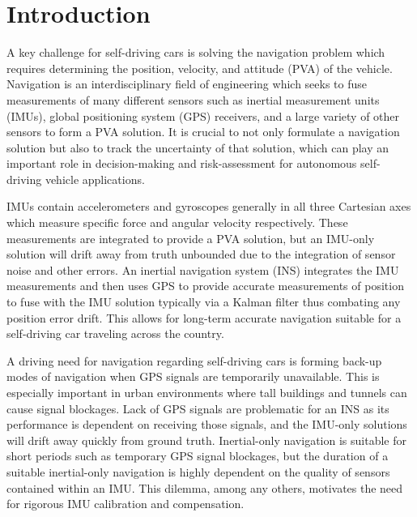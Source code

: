 
\begingroup
\allowdisplaybreaks

\section{Introduction}

A key challenge for self-driving cars is solving the navigation problem which requires determining the position, velocity, and attitude (PVA) of the vehicle. Navigation is an interdisciplinary field of engineering which seeks to fuse measurements of many different sensors such as inertial measurement units (IMUs), global positioning system (GPS) receivers, and a large variety of other sensors to form a PVA solution. It is crucial to not only formulate a navigation solution but also to track the uncertainty of that solution, which can play an important role in decision-making and risk-assessment for autonomous self-driving vehicle applications.

IMUs contain accelerometers and gyroscopes generally in all three Cartesian axes which measure specific force and angular velocity respectively. These measurements are integrated to provide a PVA solution, but an IMU-only solution will drift away from truth unbounded due to the integration of sensor noise and other errors. An inertial navigation system (INS) integrates the IMU measurements and then uses GPS to provide accurate measurements of position to fuse with the IMU solution typically via a Kalman filter thus combating any position error drift. This allows for long-term accurate navigation suitable for a self-driving car traveling across the country.

A driving need for navigation regarding self-driving cars is forming back-up modes of navigation when GPS signals are temporarily unavailable. This is especially important in urban environments where tall buildings and tunnels can cause signal blockages. Lack of GPS signals are problematic for an INS as its performance is dependent on receiving those signals, and the IMU-only solutions will drift away quickly from ground truth. Inertial-only navigation is suitable for short periods such as temporary GPS signal blockages, but the duration of a suitable inertial-only navigation is highly dependent on the quality of sensors contained within an IMU. This dilemma, among any others, motivates the need for rigorous IMU calibration and compensation.

